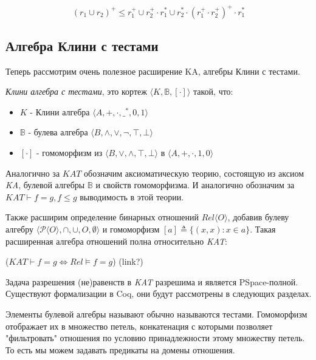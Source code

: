 \documentclass[times
              ]{itmo-student-thesis}
\begin{document}
      $$ (r_1 \cup r_2)^+ \leq r_1^+ \cup r_2^+ \cdot r_1^* \cup r_2^* \cdot (r_1^+ \cdot r_2^+)^+ \cdot r_1^* $$

    \subsection{Алгебра Клини с тестами}
      Теперь рассмотрим очень полезное расширение KA, алгебры Клини с тестами.

      \textit{Клини алгебра с тестами}, это кортеж $\langle K,\mathbb{B}, [\cdot] \rangle$ такой, что:

      \begin{itemize}
        \item $K$ - Клини алгебра $\langle A, +, \cdot, \_^*, 0, 1 \rangle $
        \item $\mathbb{B}$ - булева алгебра $\langle B, \wedge, \vee, \neg, \top, \bot \rangle $
        \item $[\cdot]$ - гомоморфизм из
          $\langle B, \vee, \wedge, \top, \bot \rangle$
        в $\langle A, +,     \cdot, 1,    0 \rangle$
      \end{itemize}

      Аналогично за $ \mathit{KAT} $ обозначим аксиоматическую теорию, состоящую из аксиом \textit{KA},
      булевой алгебры $ \mathbb{B}$ и свойств гомоморфизма. И аналогично обозначим за $ KAT \vdash f = g, f
      \leq g $ выводимость в этой теории.

      Также расширим определение бинарных отношений $Rel \langle O \rangle $, добавив булеву алгебру $\langle
      \mathcal{P}\langle O \rangle, \cap, \cup, O, \emptyset \rangle$ и гомоморфизм $ [a] \triangleq \{(x, x): x \in a\} $. Такая
      расширенная алгебра отношений полна относительно \textit{KAT}:

      ($\mathit{KAT} \vdash f = g \Leftrightarrow \mathit{Rel} \models f = g$) (link?)

      Задача разрешения (не)равенств в \textit{KAT} разрешима и является PSpace-полной\cite{kozen_kat}.
      Существуют формализации в Coq, они будут рассмотрены в следующих разделах. \cite{kat}

      Элементы булевой алгебры называют обычно называются тестами.
      Гомоморфизм отображает их в множество петель, конкатенация с которыми позволяет "фильтровать"
      отношения по условию принадлежности этому множеству петель.
      То есть мы можем задавать предикаты на домены отношения.
\end{document}
